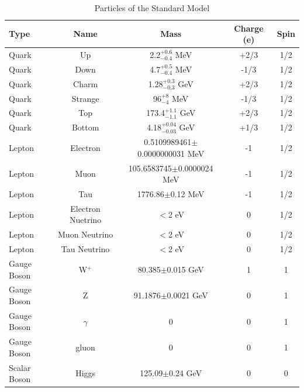 \begin{table}
  \centering
  \begin{tabular}{l c c c c}
    \toprule
    Type  & Name & Mass & Charge (e) & Spin  \\
    \midrule
    Quark & Up & 2.2$^{+ 0.6}_{-0.4}$ MeV & +2/3 & 1/2 \\
    Quark & Down & 4.7$^{+ 0.5}_{-0.4}$ MeV &  -1/3 & 1/2 \\
    \midrule
    Quark & Charm & 1.28$^{+ 0.3}_{-0.3}$ GeV& +2/3 & 1/2 \\
    Quark & Strange & 96$^{+ 8}_{-4}$ MeV& -1/3 & 1/2 \\
    \midrule
    Quark & Top & 173.4$^{+ 1.1}_{-1.1}$ GeV & +2/3 & 1/2 \\
    Quark & Bottom & 4.18$^{+ 0.04}_{-0.03}$ GeV& +1/3 & 1/2 \\
    \midrule
    \midrule
    Lepton & Electron & 0.5109989461$\pm$0.0000000031 MeV & -1 & 1/2 \\
    Lepton & Muon & 105.6583745$\pm$0.0000024 MeV& -1 & 1/2 \\
    Lepton & Tau & 1776.86$\pm$0.12 MeV & -1 & 1/2 \\
    \midrule
    Lepton & Electron Nuetrino & $<$2 eV & 0 & 1/2 \\
    Lepton & Muon Neutrino & $<$2 eV & 0 & 1/2 \\
    Lepton & Tau Neutrino & $<$2 eV & 0 & 1/2 \\
    \midrule
    \midrule
    Gauge Boson & W$^+$ & 80.385$\pm$0.015 GeV& 1 & 1 \\
    Gauge Boson & Z & 91.1876$\pm$0.0021 GeV & 0 & 1 \\
    Gauge Boson & $\gamma$ & 0 & 0 & 1 \\
    Gauge Boson & gluon & 0 & 0 & 1 \\
    \midrule
    \midrule
    Scalar Boson & Higgs & 125.09$\pm$0.24 GeV & 0 & 0 \\
    \bottomrule
  \end{tabular}
  \caption[Particles of the Standard Model]{Particles of the Standard Model \cite{Patrignani:2016xqp}}
  \label{tab:smparticles}
\end{table}

